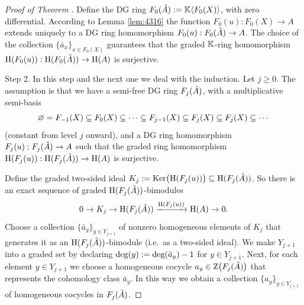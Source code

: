 \begin{proof}[Proof of Theorem \tup{\ref{thm:4310}}]
Define the DG ring 
$F_0(\tilde{A}) := \mathbb{K} \langle F_0(X) \rangle$, with zero differential. 
According to Lemma \ref{lem:4316} the function 
$F_0(u) : F_0(X) \to A$ extends uniquely to a DG ring homomorphism 
$F_0(u) : F_0(\tilde{A}) \to A$.
The choice of the collection $\{ \bar{a}_x \}_{x \in F_0(X)}$
guarantees that the graded $\mathbb{K}$-ring homomorphism 
$\operatorname{H}(F_0(u)) : \operatorname{H}(F_0(\tilde{A})) \to \operatorname{H}(A)$ 
is surjective.

\medskip \noindent
Step 2. In this step and the next one we deal with the induction. Let
$j \geq 0$. The assumption is that we have a 
semi-free DG ring $F_j(\tilde{A})$, with a multiplicative semi-basis
\begin{equation} \label{eqn:4776}
\varnothing = F_{-1}(X) \subseteq F_0(X) \subseteq \cdots \subseteq F_{j - 1}(X) \subseteq 
F_{j}(X) \subseteq F_{j}(X) \subseteq \cdots  
\end{equation}
(constant from level $j$ onward), and a DG ring homomorphism 
$F_j(u) : F_j(\tilde{A}) \to A$
such that the graded ring homomorphism 
$\operatorname{H}(F_j(u)) : \operatorname{H}(F_j(\tilde{A})) \to \operatorname{H}(A)$ 
is surjective.

Define the graded two-sided ideal 
$K_j := \operatorname{Ker} \bigl( \operatorname{H}(F_j(u)) \bigr) \subseteq \operatorname{H}(F_j(\tilde{A}))$.
So there is an exact sequence of graded $\operatorname{H}(F_j(\tilde{A}))$-bimodules 
\begin{equation} \label{eqn:4316}
0 \to K_j \to \operatorname{H}(F_j(\tilde{A})) \xrightarrow{\operatorname{H}(F_j(u))}
\operatorname{H}(A) \to  0 . 
\end{equation}
Choose a collection $\{ \bar{a}_y \}_{y \in Y_{j + 1}}$
of nonzero homogeneous elements of $K_j$ that generates it as an 
$\operatorname{H}(F_j(\tilde{A}))$-bimodule (i.e.\ as a two-sided ideal). 
We make $Y_{j + 1}$ into a graded set by declaring
$\operatorname{deg}(y) := \operatorname{deg}(\bar{a}_y) - 1$ 
for $y \in Y_{j + 1}$.
Next, for each element $y \in Y_{j + 1}$ we choose a homogeneous cocycle 
$a_y \in \operatorname{Z} \bigl( F_j(\tilde{A}) \bigr)$ that represents the cohomology 
class $\bar{a}_y$. In this way we obtain 
a collection $\{ a_y \}_{y \in Y_{j + 1}}$ of homogeneous cocycles in 
$F_j(\tilde{A})$. 


\end{proof}
